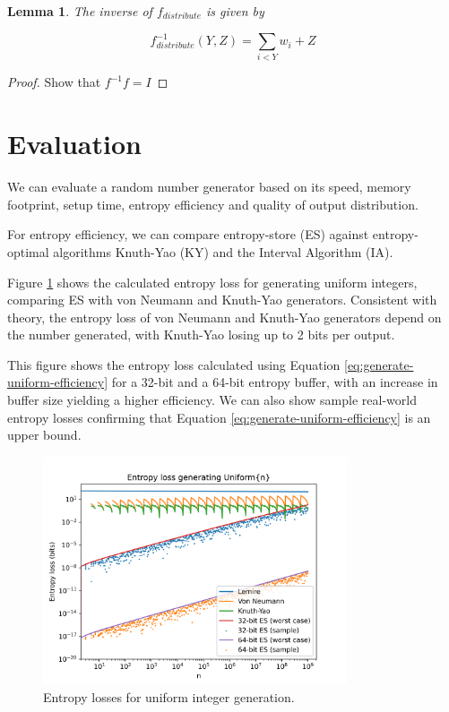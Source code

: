 \documentclass[12pt]{article}
\newtheorem{lemma}{Lemma}
\begin{document}
\begin{lemma}
The inverse of $f_{distribute}$ is given by

    \begin{equation}
    f^{-1}_{distribute}(Y,Z) = \sum_{i<Y}w_i + Z
    \end{equation}
\end{lemma}

\begin{proof}
    Show that $f^{-1}f= I$

\end{proof}




\section {Evaluation}

We can evaluate a random number generator based on its speed, memory footprint, setup time, entropy efficiency and quality of output distribution. \cite{saad2025}

For entropy efficiency, we can compare entropy-store (ES) against entropy-optimal algorithms Knuth-Yao (KY) and the Interval Algorithm (IA).

Figure \ref{fig:uniform-losses} shows the calculated entropy loss for generating uniform integers, comparing ES with von Neumann and Knuth-Yao generators. Consistent with theory, the entropy loss of von Neumann and Knuth-Yao generators depend on the number generated, with Knuth-Yao losing up to 2 bits per output.

This figure shows the entropy loss calculated using Equation \ref{eq:generate-uniform-efficiency} for a 32-bit and a 64-bit entropy buffer, with an increase in buffer size yielding a higher efficiency. We can also show sample real-world entropy losses confirming that Equation \ref{eq:generate-uniform-efficiency} is an upper bound.

\begin{figure}[ht]
\centering
\includegraphics[width=0.8\textwidth]{uniform_losses.png}
\caption{Entropy losses for uniform integer generation.}
\label{fig:uniform-losses}
\end{figure}
\end{document}
